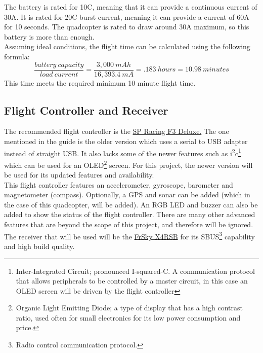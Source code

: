 \documentclass[12pt]{article}
\begin{document}
The battery is rated for 10C, meaning that it can provide a continuous current of 30A. It is rated for 20C burst current, meaning it can provide a current of 60A for 10 seconds. The quadcopter is rated to draw around 30A maximum, so this battery is more than enough.
\\

Assuming ideal conditions, the flight time can be calculated using the following formula:
\\

\begin{equation} 
\frac{battery\ capacity}{load\ current} = \frac{3,000\ mAh}{16,393.4\ mA} = .183\ hours = 10.98\ minutes
\end{equation}
This time meets the required minimum 10 minute flight time.

\subsection{Flight Controller and Receiver}
The recommended flight controller is the \href{https://www.banggood.com/Upgrade-NAZE32-F3-Flight-Controller-Acro-6-DOF-Deluxe-10-DOF-for-Multirotor-Racing-p-1010232.html?ID=17&cur_warehouse=CN}{\color{cyan}SP Racing F3 Deluxe.} The one mentioned in the guide is the older version which uses a serial to USB adapter instead of straight USB. It also lacks some of the newer features such as i\textsuperscript{2}c\footnote{Inter-Integrated Circuit; pronounced I-squared-C. A communication protocol that allows peripherals to be controlled by a master circuit, in this case an OLED screen will be driven by the flight controller} which can be used for an OLED\footnote{Organic Light Emitting Diode; a type of display that has a high contrast ratio, used often for small electronics for its low power consumption and price.} screen. For this project, the newer version will be used for its updated features and availability.
\\

This flight controller features an accelerometer, gyroscope, barometer and magnetometer (compass). Optionally, a GPS and sonar can be added (which in the case of this quadcopter, will be added). An RGB LED and buzzer can also be added to show the status of the flight controller. There are many other advanced features that are beyond the scope of this project, and therefore will be ignored.
\\

The receiver that will be used will be the \href{https://hobbyking.com/en_us/frsky-x4rsb-3-16ch-2-4ghz-accst-receiver-w-telemetry.html}{\color{cyan}FrSky X4RSB} for its SBUS\footnote{Radio control communication protocol.} capability and high build quality. 
\end{document}
